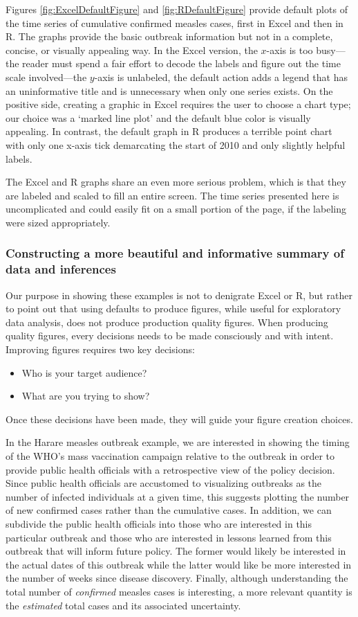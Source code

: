 \documentclass[12pt]{article}
\begin{document}
Figures \ref{fig:ExcelDefaultFigure} and \ref{fig:RDefaultFigure} provide default plots of the time series of cumulative confirmed measles cases, first in Excel and then in R.  The graphs provide the basic outbreak information but not in a complete, concise, or visually appealing way. In the Excel version, the $x$-axis is too busy---the reader must spend a fair effort to decode the labels and figure out the time scale involved---the $y$-axis is unlabeled, the default action adds a legend that has an uninformative title and is unnecessary when only one series exists. On the positive side, creating a graphic in Excel requires the user to choose a chart type; our choice was a `marked line plot' and the default blue color is visually appealing. In contrast, the default graph in R produces a terrible point chart with only one x-axis tick demarcating the start of 2010 and only slightly helpful labels. 

The Excel and R graphs share an even more serious problem, which is that they are labeled and scaled to fill an entire screen.  The time series presented here is uncomplicated and could easily fit on a small portion of the page, if the labeling were sized appropriately.

\subsubsection*{Constructing a more beautiful and informative summary of data and inferences}

Our purpose in showing these examples is not to denigrate Excel or R, but rather to point out that using defaults to produce figures, while useful for exploratory data analysis, does not produce production quality figures.  When producing quality figures, every decisions needs to be made consciously and with intent. Improving figures requires two key decisions:
\begin{itemize}
\item Who is your target audience?
\item What are you trying to show?
\end{itemize}
Once these decisions have been made, they will guide your figure creation choices.

In the Harare measles outbreak example, we are interested in showing the timing of the WHO's mass vaccination campaign relative to the outbreak in order to provide public health officials with a retrospective view of the policy decision. Since public health officials are accustomed to visualizing outbreaks as the number of infected individuals at a given time, this suggests plotting the number of new confirmed cases rather than the cumulative cases. In addition, we can subdivide the public health officials into those who are interested in this particular outbreak and those who are interested in lessons learned from this outbreak that will inform future policy. The former would likely be interested in the actual dates of this outbreak while the latter would like be more interested in the number of weeks since disease discovery. Finally, although understanding the total number of \emph{confirmed} measles cases is interesting, a more relevant quantity is the \emph{estimated} total cases and its associated uncertainty.
\end{document}
